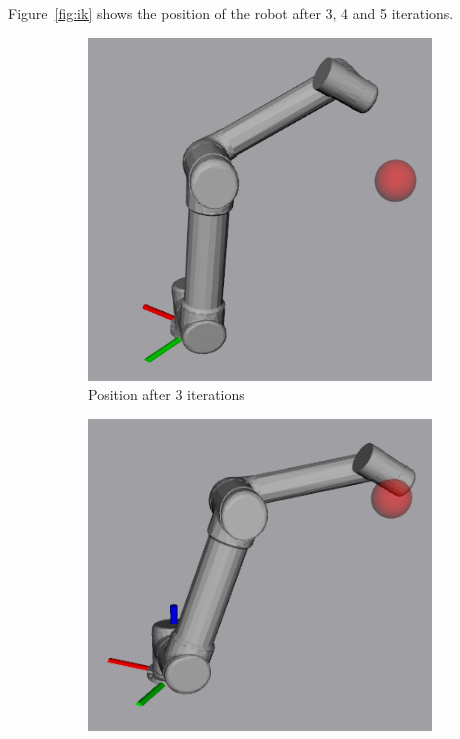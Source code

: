 \documentclass[11pt]{article}
\begin{document}
Figure~\ref{fig:ik} shows the position of the robot after 3, 4 and 5 iterations.  
\begin{figure}[H]
	\centering
	\begin{subfigure}[b]{0.3\textwidth}
		\centering
		\includegraphics[height=\textwidth]{pics/3iters.png}
		\caption{Position after 3 iterations}
		\label{fig:3it}
	\end{subfigure}
	\begin{subfigure}[b]{0.3\textwidth}
		\centering
		\includegraphics[width=\textwidth]{pics/4iters.png}

\end{subfigure}
\end{figure}
\end{document}
